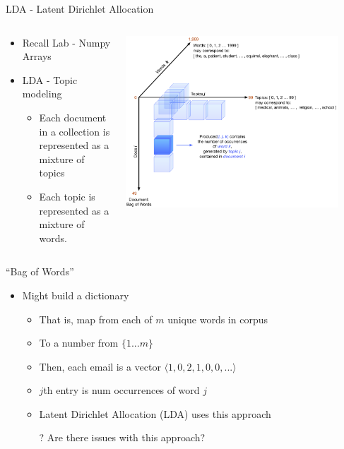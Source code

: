 \documentclass[aspectratio=169]{beamer}
\begin{document}
\begin{frame}{LDA - Latent Dirichlet Allocation}

\begin{columns}
\begin{column}{0.5\textwidth}
\begin{itemize}
\item Recall Lab  - Numpy Arrays %
\item LDA - Topic modeling
	\begin{itemize}
	\item Each document in a collection is represented as a mixture of topics
	\item Each topic is represented as a mixture of words.
	\end{itemize}
\end{itemize}
\end{column}
\begin{column}{0.5\textwidth}
    \includegraphics[width=0.9\textwidth]{lectSup/3D.pdf}
\end{column}
\end{columns}

\end{frame}
\begin{frame}{``Bag of Words''}

\begin{itemize}
\item Might build a dictionary
	\begin{itemize}
	\item That is, map from each of $m$ unique words in corpus
	\item To a number from $\{1...m\}$
	\item Then, each email is a vector $\langle 1, 0, 2, 1, 0, 0, ... \rangle$
	\item $j$th entry is num occurrences of word $j$
	\item Latent Dirichlet Allocation (LDA) uses this approach
	\item[?] Are there issues with this approach?
	\end{itemize}
\end{itemize}
\end{frame}
\end{document}
